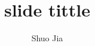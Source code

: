 \documentclass[aspectratio=169,xcolor=dvipsnames]{beamer}
\title{slide tittle}
\date{}
\author{Shuo Jia}
\begin{document}
\maketitle





\begin{frame}{}

\end{frame}{}
\end{document}
